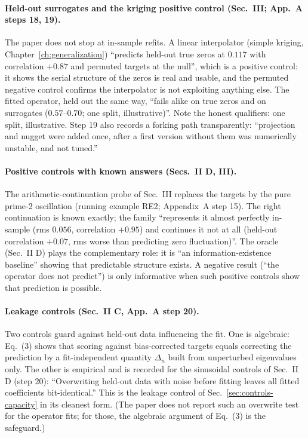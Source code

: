 \paragraph{Held-out surrogates and the kriging positive control (Sec.~III; App.~A steps 18, 19).} The paper does not stop at in-sample refits. A linear interpolator (simple kriging, Chapter~\ref{ch:generalization}) ``predicts held-out true zeros at $0.117$ with correlation $+0.87$ and permuted targets at the null'', which is a positive control: it shows the serial structure of the zeros is real and usable, and the permuted negative control confirms the interpolator is not exploiting anything else. The fitted operator, held out the same way, ``fails alike on true zeros and on surrogates ($0.57$--$0.70$; one split, illustrative)''. Note the honest qualifiers: one split, illustrative. Step 19 also records a forking path transparently: ``projection and nugget were added once, after a first version without them was numerically unstable, and not tuned.''

\paragraph{Positive controls with known answers (Secs.~II D, III).} The arithmetic-continuation probe of Sec.~III replaces the targets by the pure prime-2 oscillation (running example RE2; Appendix~A step 15). The right continuation is known exactly; the family ``represents it almost perfectly in-sample (rms $0.056$, correlation $+0.95$) and continues it not at all (held-out correlation $+0.07$, rms worse than predicting zero fluctuation)''. The oracle (Sec.~II D) plays the complementary role: it is ``an information-existence baseline'' showing that predictable structure exists. A negative result (``the operator does not predict'') is only informative when such positive controls show that prediction is possible.

\paragraph{Leakage controls (Sec.~II C, App.~A step 20).} Two controls guard against held-out data influencing the fit. One is algebraic: Eq.~(3) shows that scoring against bias-corrected targets equals correcting the prediction by a fit-independent quantity $\Delta_n$ built from unperturbed eigenvalues only. The other is empirical and is recorded for the sinusoidal controls of Sec.~II D (step 20): ``Overwriting held-out data with noise before fitting leaves all fitted coefficients bit-identical.'' This is the leakage control of Sec.~\ref{sec:controls-capacity} in its cleanest form. (The paper does not report such an overwrite test for the operator fits; for those, the algebraic argument of Eq.~(3) is the safeguard.)

